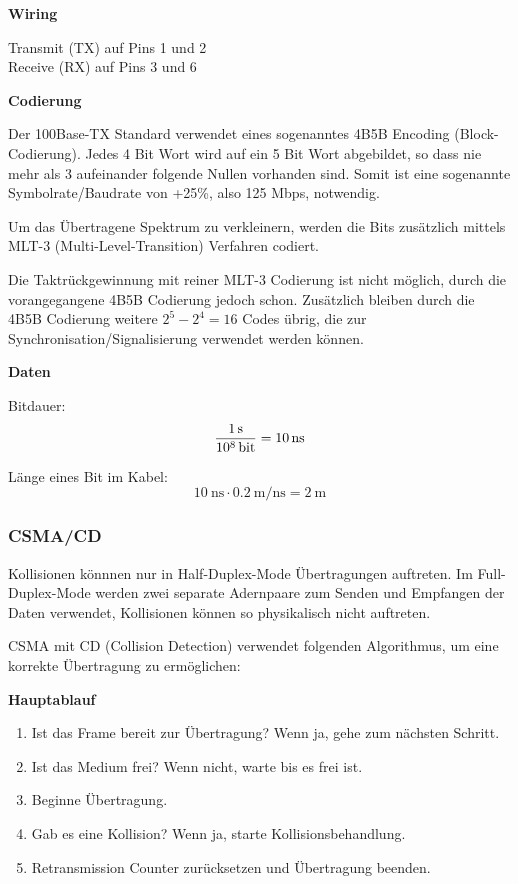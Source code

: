 \textbf{Wiring}

Transmit (TX) auf Pins 1 und 2\\
Receive (RX) auf Pins 3 und 6

\textbf{Codierung}

Der 100Base-TX Standard verwendet eines sogenanntes 4B5B Encoding
(Block-Codierung). Jedes 4 Bit Wort wird auf ein 5 Bit Wort abgebildet, so dass
nie mehr als 3 aufeinander folgende Nullen vorhanden sind. Somit ist eine
sogenannte Symbolrate/Baudrate von +25\%, also 125 Mbps, notwendig.

Um das Übertragene Spektrum zu verkleinern, werden die Bits zusätzlich mittels
MLT-3 (Multi-Level-Transition) Verfahren codiert.

Die Taktrückgewinnung mit reiner MLT-3 Codierung ist nicht möglich, durch die
vorangegangene 4B5B Codierung jedoch schon. Zusätzlich bleiben durch die 4B5B
Codierung weitere $2^5-2^4=16$ Codes übrig, die zur
Synchronisation/Signalisierung verwendet werden können.

\textbf{Daten}

Bitdauer:
\[
	\frac{\SI{1}{\second}}{\SI{e8}{\bit}} = \SI{10}{\ns}
\]

Länge eines Bit im Kabel:
\[
	\SI{10}{\ns} \cdot \SI{0.2}{\meter\per\ns} = \SI{2}{\meter}
\]


\subsubsection{CSMA/CD}

Kollisionen könnnen nur in Half-Duplex-Mode Übertragungen auftreten. Im
Full-Duplex-Mode werden zwei separate Adernpaare zum Senden und Empfangen der
Daten verwendet, Kollisionen können so physikalisch nicht auftreten.

CSMA mit CD (Collision Detection) verwendet folgenden Algorithmus, um eine
korrekte Übertragung zu ermöglichen:

\textbf{Hauptablauf}

\begin{enumerate}
	\item Ist das Frame bereit zur Übertragung? Wenn ja, gehe zum nächsten
		Schritt.
	\item Ist das Medium frei? Wenn nicht, warte bis es frei ist.
	\item Beginne Übertragung.
	\item Gab es eine Kollision? Wenn ja, starte Kollisionsbehandlung.
	\item Retransmission Counter zurücksetzen und Übertragung beenden.
\end{enumerate}

